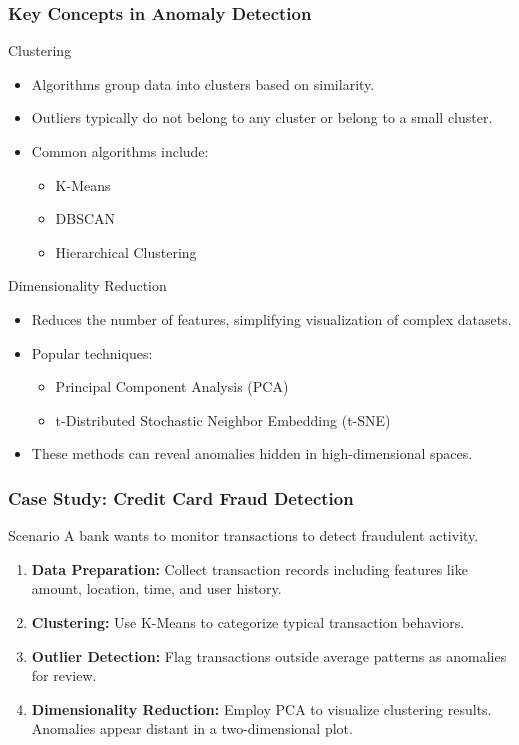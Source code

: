 \documentclass[aspectratio=169]{beamer}
\begin{document}
\begin{frame}[fragile]
    \frametitle{Key Concepts in Anomaly Detection}
    \begin{block}{Clustering}
        \begin{itemize}
            \item Algorithms group data into clusters based on similarity.
            \item Outliers typically do not belong to any cluster or belong to a small cluster.
            \item Common algorithms include:
            \begin{itemize}
                \item K-Means
                \item DBSCAN
                \item Hierarchical Clustering
            \end{itemize}
        \end{itemize}
    \end{block}
    
    \begin{block}{Dimensionality Reduction}
        \begin{itemize}
            \item Reduces the number of features, simplifying visualization of complex datasets.
            \item Popular techniques:
            \begin{itemize}
                \item Principal Component Analysis (PCA)
                \item t-Distributed Stochastic Neighbor Embedding (t-SNE)
            \end{itemize}
            \item These methods can reveal anomalies hidden in high-dimensional spaces.
        \end{itemize}
    \end{block}
\end{frame}

\begin{frame}[fragile]
    \frametitle{Case Study: Credit Card Fraud Detection}
    \begin{block}{Scenario}
        A bank wants to monitor transactions to detect fraudulent activity.
    \end{block}
    \begin{enumerate}
        \item \textbf{Data Preparation:} Collect transaction records including features like amount, location, time, and user history.
        \item \textbf{Clustering:} Use K-Means to categorize typical transaction behaviors.
        \item \textbf{Outlier Detection:} Flag transactions outside average patterns as anomalies for review.
        \item \textbf{Dimensionality Reduction:} Employ PCA to visualize clustering results. Anomalies appear distant in a two-dimensional plot.
    \end{enumerate}
\end{frame}
\end{document}
